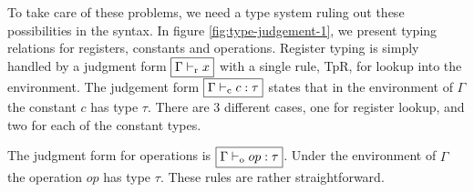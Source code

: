 \documentclass[a4paper, oneside, 10pt, draft]{memoir}
\begin{document}
To take care of these problems, we need a type system ruling out these
possibilities in the syntax. In figure \ref{fig:type-judgement-1}, we
present typing relations for registers, constants and
operations. Register typing is simply handled by a judgment form
$\boxed{\Gamma |-_{\mathrm{r}} x}$ with a single rule, TpR, for lookup into the
environment. The judgement form $\boxed{\Gamma |-_{\mathrm{c}} c : \tau}$ states
that in the environment of $\Gamma$ the constant $c$ has type
$\tau$. There are 3 different cases, one for register lookup, and two
for each of the constant types.

The judgment form for operations is $\boxed{\Gamma |-_{\mathrm{o}} op :
  \tau}$. Under the environment of $\Gamma$ the operation $op$ has
type $\tau$. These rules are rather straightforward.

\newcommand{\btype}{\ntypes -> \bullet}
\end{document}

